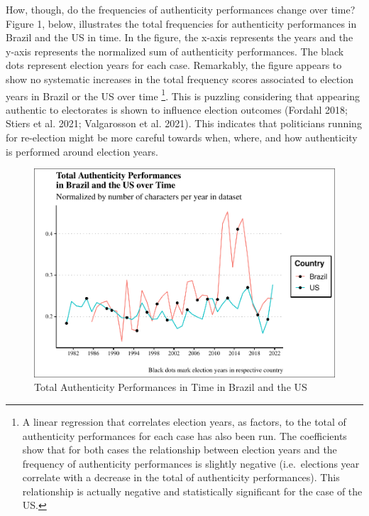 \documentclass[smallextended]{svjour3}       %
\begin{document}
How, though, do the frequencies of authenticity performances change over
time? Figure 1, below, illustrates the total frequencies for
authenticity performances in Brazil and the US in time. In the figure,
the x-axis represents the years and the y-axis represents the normalized
sum of authenticity performances. The black dots represent election
years for each case. Remarkably, the figure appears to show no
systematic increases in the total frequency scores associated to
election years in Brazil or the US over time \footnote{ A linear
  regression that correlates election years, as factors, to the total of
  authenticity performances for each case has also been run. The
  coefficients show that for both cases the relationship between
  election years and the frequency of authenticity performances is
  slightly negative (i.e.~elections year correlate with a decrease in
  the total of authenticity performances). This relationship is actually
  negative and statistically significant for the case of the US.}. This
is puzzling considering that appearing authentic to electorates is shown
to influence election outcomes (Fordahl 2018; Stiers et al. 2021;
Valgarosson et al. 2021). This indicates that politicians running for
re-election might be more careful towards when, where, and how
authenticity is performed around election years.

\begin{figure}
\centering
\includegraphics{antipc_files/figure-latex/Figure 1-1.pdf}
\caption{Total Authenticity Performances in Time in Brazil and the US}
\end{figure}
\end{document}
